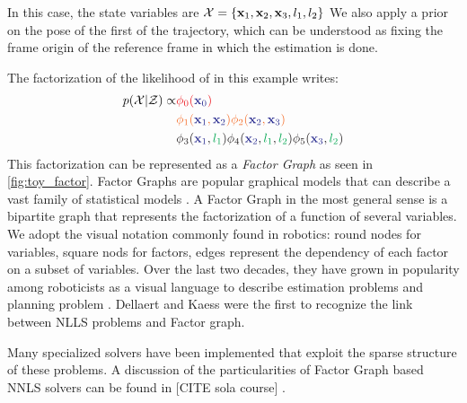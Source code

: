 In this case, the state variables are $\mathcal{X} = \{ {\bf x}_1, {\bf x}_2, {\bf x}_3, l_1, l_2\}$ %
We also apply a prior on the pose of the first \keyframe of the trajectory, which can be understood as fixing the frame origin of the reference 
frame in which the estimation is done.

The factorization of the likelihood of  in this example writes:
%
\begin{align}
    p(\mathcal{X} | \mathcal{Z}) \propto 
    &{\color{Red} \phi_0({\color{Blue} \bfx_{0}})} \\ 
    &{\color{Orange} \phi_1({\color{Blue} \bfx_1}, {\color{Blue} \bfx_2}) \phi_2({\color{Blue} \bfx_2}, {\color{Blue} \bfx_3})} \\ 
    &{\color{Black} \phi_3({\color{Blue} \bfx_1}, {\color{Green} l_1}) \phi_4({\color{Blue} \bfx_2}, {\color{Green} l_1}, {\color{Green} l_2}) \phi_5({\color{Blue} \bfx_3}, {\color{Green} l_2})} \\ 
\end{align}
%
This factorization can be represented as a \textit{Factor Graph} as seen in \ref{fig:toy_factor}. 
Factor Graphs are popular graphical models \cite{koller2009probabilistic} that can describe a vast family of statistical models \cite{loeliger2004introduction}.
A Factor Graph in the most general sense is a bipartite graph that represents the factorization of a function of several variables. 
We adopt the visual notation commonly found in robotics: round nodes for variables, square nods for factors, edges represent the dependency 
of each factor on a subset of variables. Over the last two decades, they have grown in popularity among roboticists as a visual language to describe 
estimation problems \cite{dellaert2017factor} and planning problem \cite{dong2016motion}. Dellaert and Kaess \cite{dellaert2006square} were the first to
recognize the link between NLLS problems and Factor graph.

Many specialized solvers \cite{grisetti2011g2o, dellaert2012factor, ila2017slam++} have been implemented that exploit the sparse structure of these 
problems. A discussion of the particularities of Factor Graph based NNLS solvers can be found in [CITE sola course] \cite{dellaert2017factor}.


